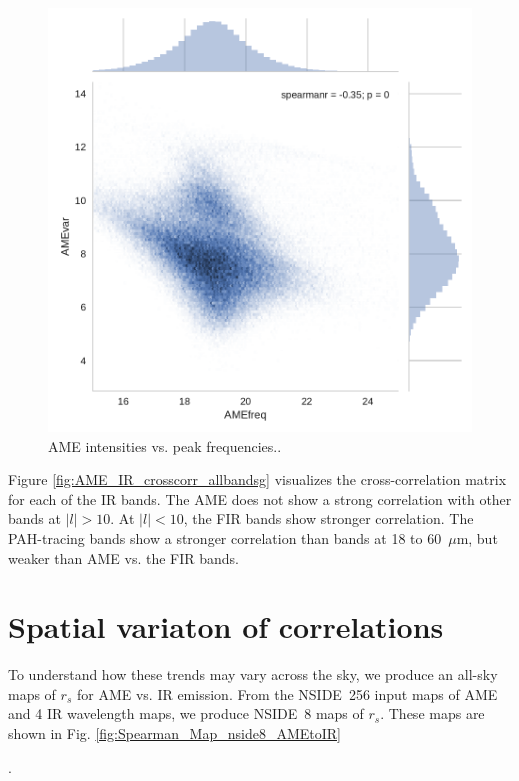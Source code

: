 {\begin{figure}
         \includegraphics[width=\textwidth/3]{../Plots/ch_allsky/AMEfreq_vs_var.pdf}
         \centering
         \caption{AME intensities vs. peak frequencies..}
         \label{fig:AMEfreq_vs_int}
       \end{figure}

     Figure \ref{fig:AME_IR_crosscorr_allbandsg} visualizes the cross-correlation matrix for each of the IR bands. The AME does not show a strong correlation with other bands at $|l|>10$. At $|l|<10$, the FIR bands show stronger correlation. The PAH-tracing bands show a stronger correlation than bands at 18 to 60~$\mu$m, but weaker than AME vs. the FIR bands.

  \section{Spatial variaton of correlations}
    To understand how these trends may vary across the sky, we produce an all-sky maps of $r_{s}$ for AME vs. IR emission. From the NSIDE~256 input maps of AME and 4 IR wavelength maps, we produce NSIDE~8 maps of $r_{s}$. These maps are shown in Fig. \ref{fig:Spearman_Map_nside8_AMEtoIR}}.


